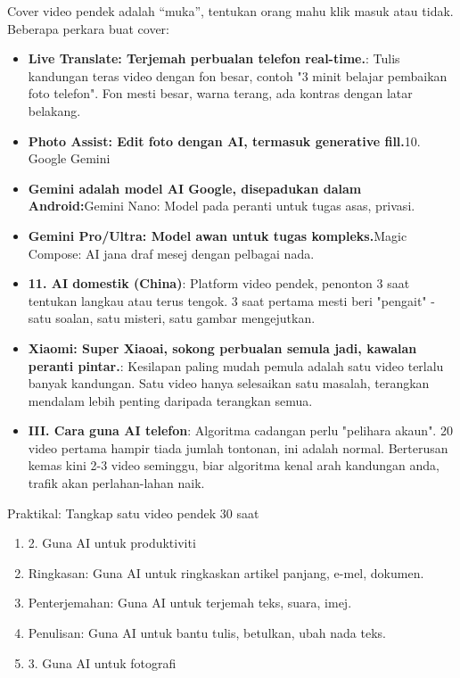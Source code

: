 
Cover video pendek adalah “muka”, tentukan orang mahu klik masuk atau tidak. Beberapa perkara buat cover:

\begin{itemize}
  \item \textbf{Live Translate: Terjemah perbualan telefon real-time.}: Tulis kandungan teras video dengan fon besar, contoh "3 minit belajar pembaikan foto telefon". Fon mesti besar, warna terang, ada kontras dengan latar belakang.
  \item \textbf{Photo Assist: Edit foto dengan AI, termasuk generative fill.}10. Google Gemini
  \item \textbf{Gemini adalah model AI Google, disepadukan dalam Android:}Gemini Nano: Model pada peranti untuk tugas asas, privasi.
  \item \textbf{Gemini Pro/Ultra: Model awan untuk tugas kompleks.}Magic Compose: AI jana draf mesej dengan pelbagai nada.
\end{itemize}


\begin{itemize}
  \item \textbf{11. AI domestik (China)}: Platform video pendek, penonton 3 saat tentukan langkau atau terus tengok. 3 saat pertama mesti beri "pengait" - satu soalan, satu misteri, satu gambar mengejutkan.
  \item \textbf{Xiaomi: Super Xiaoai, sokong perbualan semula jadi, kawalan peranti pintar.}: Kesilapan paling mudah pemula adalah satu video terlalu banyak kandungan. Satu video hanya selesaikan satu masalah, terangkan mendalam lebih penting daripada terangkan semua.
  \item \textbf{III. Cara guna AI telefon}: Algoritma cadangan perlu "pelihara akaun". 20 video pertama hampir tiada jumlah tontonan, ini adalah normal. Berterusan kemas kini 2-3 video seminggu, biar algoritma kenal arah kandungan anda, trafik akan perlahan-lahan naik.
\end{itemize}

\begin{tcbpractice}{Praktikal: Tangkap satu video pendek 30 saat}
\begin{enumerate}
  \item 2. Guna AI untuk produktiviti
  \item Ringkasan: Guna AI untuk ringkaskan artikel panjang, e-mel, dokumen.
  \item Penterjemahan: Guna AI untuk terjemah teks, suara, imej.
  \item Penulisan: Guna AI untuk bantu tulis, betulkan, ubah nada teks.
  \item 3. Guna AI untuk fotografi
\end{enumerate}

\end{tcbpractice}

